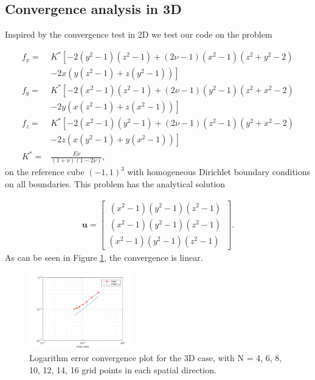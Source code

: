 

\subsection{Convergence analysis in 3D}

Inspired by the convergence test in 2D we test our code on the problem 

\begin{align}
f_x = &K^* \left[-2(y^2-1)(z^2-1) + (2 \nu -1)(x^2-1)(z^2 +y^2-2) \right.\nonumber\\
 &\left. -2x(y(z^2-1) + z(y^2-1)) \right] \\
 f_y = &K^* \left[-2(x^2-1)(z^2-1) + (2 \nu -1)(y^2-1)(z^2 +x^2-2) \right.\nonumber\\
 &\left. -2y(x(z^2-1) + z(x^2-1)) \right] \\
 f_z = &K^* \left[-2(x^2-1)(y^2-1) + (2 \nu -1)(z^2-1)(y^2 +x^2-2) \right.\nonumber\\
 &\left. -2z(x(y^2-1) + y(x^2-1)) \right] \\
 K^* = & \frac{E \nu}{(1+\nu)(1-2\nu)},
\end{align}
on the reference cube $(-1,1)^3$ with homogeneous Dirichlet boundary conditions on all boundaries. This problem has the analytical solution

\begin{align}
\bm{u} = \begin{bmatrix}
\, (x^2-1)(y^2-1)(z^2-1) \, \\
\, (x^2-1)(y^2-1)(z^2-1) \, \\
(x^2-1)(y^2-1)(z^2-1)
\end{bmatrix}.
\end{align}
As can be seen in Figure \ref{fig:convergence3d}, the convergence is linear.

\begin{figure}
\center
\includegraphics[width=0.4\textwidth]{convergence3d}
\caption{Logarithm error convergence plot for the 3D case, with N = 4, 6, 8, 10, 12, 14, 16 grid points in each spatial direction.}
\label{fig:convergence3d}
\end{figure}

